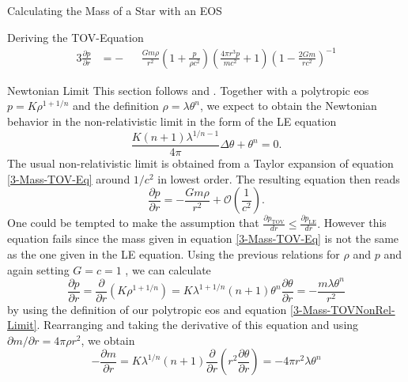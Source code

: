 \begin{section}{Calculating the Mass of a Star with an EOS}
\begin{subsection}{Deriving the TOV-Equation}
\begin{alignat}{3}
	\frac{\partial p}{\partial r} &= -&&\frac{Gm\rho}{r^2}\left(1+\frac{p}{\rho c^2}\right)\left(\frac{4\pi r^3p}{mc^2}+1\right)\left(1-\frac{2Gm}{rc^2}\right)^{-1}
	\label{3-Mass-TOV-Eq}
\end{alignat}
\end{subsection}
%
%
%
\pagebreak
\begin{subsection}{Newtonian Limit}
\label{3-Mass-LEDerivation}
This section follows \cite{weissteinLaneEmdenDifferentialEquation2020} and \cite[89\psqq]{chandrasekharChandrasekharAnIntroductionStudy1958}. Together with a polytropic \ac{eos} $p=K\rho^{1+1/n}$ and the definition $\rho=\lambda\theta^n$, we expect to obtain the Newtonian behavior in the non-relativistic limit in the form of the \ac{LE} equation
\begin{equation}
	\frac{K(n+1)\lambda^{1/n-1}}{4\pi}\Delta\theta+\theta^n=0.
\end{equation}
The usual non-relativistic limit is obtained from a Taylor expansion of equation \eqref{3-Mass-TOV-Eq} around $1/c^2$ in lowest order. The resulting equation then reads
\begin{equation}
	\frac{\partial p}{\partial r} = -\frac{Gm\rho}{r^2} + \mathcal{O}\left(\frac{1}{c^2}\right).
	\label{3-Mass-TOVNonRel-Limit}
\end{equation}
One could be tempted to make the assumption that $\frac{\partial p_{\text{TOV}}}{dr} \leq \frac{\partial p_{\text{LE}}}{dr}.$ However this equation fails since the mass given in equation \eqref{3-Mass-TOV-Eq} is not the same as the one given in the \ac{LE} equation. Using the previous relations for $\rho$ and $p$ and again setting $G=c=1$ , we can calculate
\begin{equation}
	\frac{\partial p}{\partial r} = \frac{\partial}{\partial r}\left(K\rho^{1+1/n}\right)= K\lambda^{1+1/n}(n+1)\theta^n\frac{\partial\theta}{\partial r} = -\frac{m\lambda\theta^n}{r^2}
\end{equation}
by using the definition of our polytropic \ac{eos} and equation \eqref{3-Mass-TOVNonRel-Limit}. Rearranging and taking the derivative of this equation and using $\partial m/\partial r = 4\pi\rho r^2$, we obtain
\begin{equation}
	- \frac{\partial m}{\partial r} = K\lambda^{1/n}(n+1)\frac{\partial}{\partial r}\left(r^2\frac{\partial\theta}{\partial r}\right) = -4\pi r^2\lambda\theta^n
\end{equation}

\end{subsection}
\end{section}
